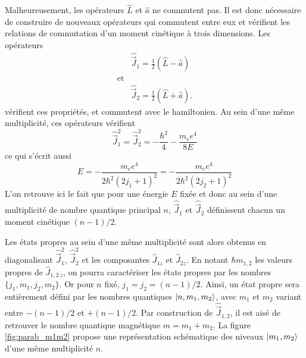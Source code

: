 Malheureusement, les opérateurs $\hat{L}$ et $\hat{a}$ ne commutent pas.
Il est donc nécessaire de construire de nouveaux opérateurs qui commutent entre eux et vérifient les relations de commutation d'un moment cinétique à trois dimensions.
Les opérateurs
\begin{equation}\label{eq:defJ1J2}
\begin{aligned}
&\hat{\vec{J}}_1 = \frac{1}{2}\left( \hat{L} - \hat{a} \right)\\
\text{et} & \\
&\hat{\vec{J}}_2 = \frac{1}{2}\left( \hat{L} + \hat{a} \right).
\end{aligned}
\end{equation}
vérifient ces propriétés, et commutent avec le hamiltonien.
Au sein d'une même multiplicité, ces opérateurs vérifient 
\begin{equation}\label{eq:defJ1J2sq}
\hat{\vec{J}}_1^2 = \hat{\vec{J}}_2^2 = -\frac{\hbar^2}{4}-\frac{m_ee^4}{8E}
\end{equation}
ce qui s'écrit aussi
\begin{equation}\label{eq:E_j1_j2}
E=-\frac{m_ee^4}{2\hbar^2(2j_1+1)^2}=-\frac{m_ee^4}{2\hbar^2(2j_2+1)^2}
\end{equation}
L'on retrouve ici le fait que pour une énergie $E$ fixée et donc au sein d'une multiplicité de nombre quantique principal $n$, $\hat{\vec{J}}_1$ et $\hat{\vec{J}}_2$ définissent chacun un moment cinétique $(n-1)/2$.

Les états propres au sein d'une même multiplicité sont alors obtenus en diagonalisant $\hat{\vec{J}}_1^2$, $\hat{\vec{J}}_2^2$ et les composantes $\hat{J}_{1z}$ et $\hat{J}_{2z}$.
En notant $\hbar m_{1,2}$ les valeurs propres de $\hat{J}_{1,2~z}$, on pourra caractériser les états propres par les nombres $\{j_1,m_1,j_2,m_2\}$.
Or pour $n$ fixé, $j_1=j_2=(n-1)/2$. Ainsi, un état propre sera entièrement défini par les nombres quantiques $\ket{n,m_1,m_2}$, avec $m_1$ et $m_2$ variant entre $-(n-1)/2$ et $+(n-1)/2$.
Par construction de $\hat{\vec{J}}_{1,2}$, il est aisé de retrouver le nombre quantique magnétique $m=m_1+m_2$.
La figure \eqref{fig:parab_m1m2} propose une représentation schématique des niveaux $\ket{m_1,m_2}$ d'une même multiplicité $n$.

